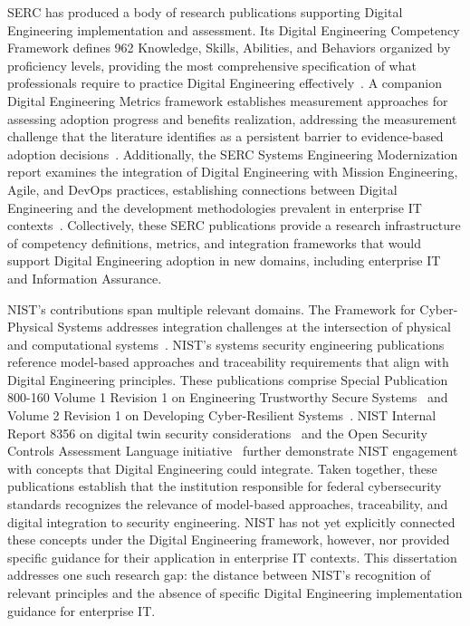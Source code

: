SERC has produced a body of research publications supporting Digital Engineering implementation and assessment. Its Digital Engineering Competency Framework defines 962 Knowledge, Skills, Abilities, and Behaviors organized by proficiency levels, providing the most comprehensive specification of what professionals require to practice Digital Engineering effectively~\parencite{Hutchinson_2021}. A companion Digital Engineering Metrics framework establishes measurement approaches for assessing adoption progress and benefits realization, addressing the measurement challenge that the literature identifies as a persistent barrier to evidence-based adoption decisions~\parencite{Hutchison_2020}. Additionally, the SERC Systems Engineering Modernization report examines the integration of Digital Engineering with Mission Engineering, Agile, and DevOps practices, establishing connections between Digital Engineering and the development methodologies prevalent in enterprise IT contexts~\parencite{SERC_SE_Modernization_2022}. Collectively, these SERC publications provide a research infrastructure of competency definitions, metrics, and integration frameworks that would support Digital Engineering adoption in new domains, including enterprise IT and Information Assurance.

NIST's contributions span multiple relevant domains. The Framework for Cyber-Physical Systems addresses integration challenges at the intersection of physical and computational systems~\parencite{NIST_CPS_Framework_2017}. NIST's systems security engineering publications reference model-based approaches and traceability requirements that align with Digital Engineering principles. These publications comprise Special Publication 800-160 Volume 1 Revision 1 on Engineering Trustworthy Secure Systems~\parencite{Ross_Winstead_McEvilley_2022} and Volume 2 Revision 1 on Developing Cyber-Resilient Systems~\parencite{NIST_SP_800_160_V2_2021}. NIST Internal Report 8356 on digital twin security considerations~\parencite{NIST_IR_8356_2025} and the Open Security Controls Assessment Language initiative~\parencite{NIST_OSCAL_2023} further demonstrate NIST engagement with concepts that Digital Engineering could integrate. Taken together, these publications establish that the institution responsible for federal cybersecurity standards recognizes the relevance of model-based approaches, traceability, and digital integration to security engineering. NIST has not yet explicitly connected these concepts under the Digital Engineering framework, however, nor provided specific guidance for their application in enterprise IT contexts. This dissertation addresses one such research gap: the distance between NIST's recognition of relevant principles and the absence of specific Digital Engineering implementation guidance for enterprise IT.

